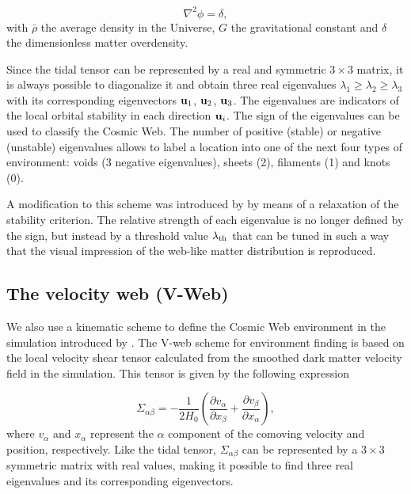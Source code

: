 \documentclass[a4,useAMS,usenatbib,usegraphicx]{mn2e}
\newcommand{\pr}[1]{ \left( #1 \right) }
\newcommand{\eq}[2]{\begin{equation} \label{eq:#1} #2 \end{equation}}
\begin{document}
\eq{Poisson}
{	\nabla^2\phi = \delta,	}
with $\bar{\rho}$ the average density in the Universe, $G$ the 
gravitational constant and $\delta$ the dimensionless matter
overdensity. 

Since the tidal tensor can be represented by a real and  symmetric
$3\times 3$ matrix, it is always possible to diagonalize  
it and obtain three real eigenvalues $\lambda_{1}\geq\lambda_{2}\geq
\lambda_3$ with its corresponding eigenvectors ${\bf u}_{1}$, ${\bf u}_{2}$,
${\bf u}_{3}$. 
The eigenvalues are indicators of the local  orbital stability
in each direction ${\bf u}_i$. 
The sign of the eigenvalues can be used to classify the Cosmic Web.
The number of positive (stable) or negative (unstable) eigenvalues allows 
to label a location into one of the next four types of environment: 
voids (3 negative eigenvalues), sheets (2), filaments (1) and knots (0). 

A modification to this scheme was introduced by \citet{Forero09}
by means of a relaxation of the stability criterion. 
The relative strength  of each eigenvalue is no longer defined by the
sign, but instead by a threshold value $\lambda_{\rm th}$ that can be
tuned in such a way that the visual impression of the web-like matter
distribution is reproduced. 
 
\subsection{The velocity web (V-Web)}
\label{subsec:Vweb}


We also use a kinematic scheme to define the Cosmic Web environment in 
the simulation introduced by \cite{Hoffman12}.
The V-web scheme for environment finding is based on the
local velocity shear tensor calculated from the smoothed dark matter 
velocity field in the simulation. This tensor is given by the 
following expression

\eq{V_web}
{	\Sigma_{\alpha\beta} = -\frac{1}{2H_0}\pr{\frac{\partial v_{\alpha}}
{\partial x_{\beta}}+\frac{\partial v_{\beta}}{\partial x_{\alpha}}},}
where $v_{\alpha}$ and $x_{\alpha}$ represent the $\alpha$ component of 
the comoving velocity and position, respectively. Like the tidal tensor, 
$\Sigma_{\alpha\beta}$ can be represented by a $3\times 3$ symmetric 
matrix with real values, making it possible to find three real
eigenvalues and its corresponding eigenvectors.
\end{document}
